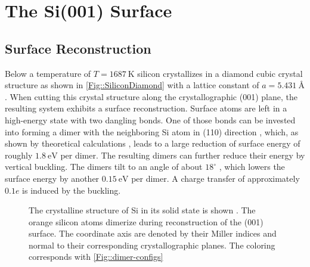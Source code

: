 	\chapter{The Si(001) Surface} \label{Section::Silicon}
	\section{Surface Reconstruction}
	Below a temperature of $T =	1687~\text{K}$ silicon crystallizes in a diamond cubic crystal structure as shown in \autoref{Fig::SiliconDiamond} with a lattice constant of $a =	5.431~\text{\AA} $ \cite{tiesinga2021codata}. When cutting this crystal structure along the crystallographic (001) plane, the resulting system exhibits a surface reconstruction. Surface atoms are left in a high-energy state with two dangling bonds. One of those bonds can be invested into forming a dimer with the neighboring Si atom in (110) direction \cite{chadi1979atomic}, which, as shown by theoretical calculations \cite{ramstad1995theoretical, batra1990atomic, dabrowski1992self}, leads to a large reduction of surface energy of roughly $1.8~\text{eV}$ per dimer.	The resulting dimers can further reduce their energy by vertical buckling. The dimers tilt to an angle of about $18^\circ$ \cite{ramstad1995theoretical, pillay2004revisit}, which lowers the surface energy by another $0.15~\text{eV}$ \cite{inoue1994order} per dimer. A charge transfer of approximately $0.1 e$  \cite{brand2023critical, landemark1992core} is induced by the buckling. \begin{figure}
		\centering
		
		\caption{The crystalline structure of Si in its solid state is shown \cite{sistrucure}.  The orange silicon atoms dimerize during reconstruction of the (001) surface. The coordinate axis are denoted by their Miller indices and normal to their corresponding crystallographic planes. The coloring corresponds with \autoref{Fig::dimer-configs}}
		\label{Fig::SiliconDiamond}
	\end{figure} \\

